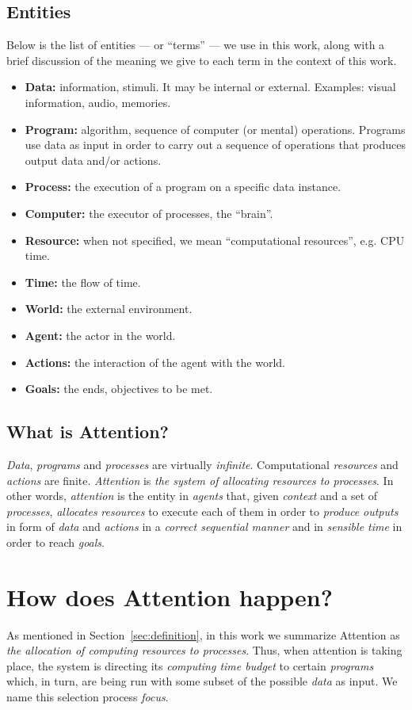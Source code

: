 \documentclass[11pt]{article}
\begin{document}
\subsection{Entities}
Below is the list of entities --- or ``terms'' --- we use in this work, along with a brief discussion of the meaning
we give to each term in the context of this work.

\begin{itemize}
    \item\textbf{Data:} information, stimuli. It may be internal or external. Examples: visual information, audio, memories.
    \item\textbf{Program:} algorithm, sequence of computer (or mental) operations. Programs use data as input in order to carry out a sequence of operations that produces output data and/or actions.
    \item\textbf{Process:} the execution of a program on a specific data instance.
    \item\textbf{Computer:} the executor of processes, the “brain”.
    \item\textbf{Resource:} when not specified, we mean “computational resources”, e.g. CPU time.
    \item\textbf{Time:} the flow of time.
    \item\textbf{World:} the external environment.
    \item\textbf{Agent:} the actor in the world.
    \item\textbf{Actions:} the interaction of the agent with the world.
    \item\textbf{Goals:} the ends, objectives to be met.
\end{itemize}

\subsection{What is Attention?}
\emph{Data}, \emph{programs} and \emph{processes} are virtually \emph{infinite}.
Computational \emph{resources} and \emph{actions} are finite.
\emph{Attention} is \emph{the system of allocating resources to processes}.
In other words, \emph{attention} is the entity in \emph{agents} that, given \emph{context} and a set of \emph{processes},
\emph{allocates} \emph{resources} to execute each of them in order to \emph{produce} \emph{outputs} in form of \emph{data} and \emph{actions} in a \emph{correct sequential manner} and in \emph{sensible time} in order to reach \emph{goals}.

\section{How does Attention happen?}\label{sec:taxonomy}
As mentioned in Section~\ref{sec:definition},
in this work we summarize Attention as \emph{the allocation of computing resources to processes}.
Thus, when attention is taking place, the system is directing its \emph{computing time budget} to certain \emph{programs} which,
in turn, are being run with some subset of the possible \emph{data} as input.
We name this selection process \emph{focus}.
\end{document}
